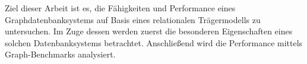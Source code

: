 Ziel dieser Arbeit ist es, die Fähigkeiten und Performance eines Graphdatenbanksystems auf Basis eines relationalen Trägermodells zu untersuchen. Im Zuge dessen werden zuerst die besonderen Eigenschaften eines solchen Datenbanksystems betrachtet. Anschließend wird die Performance mittels Graph-Benchmarks analysiert.